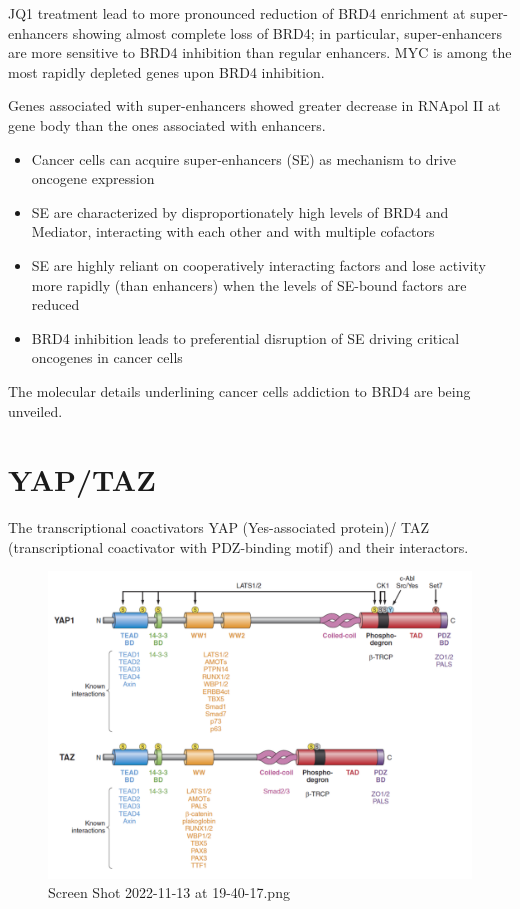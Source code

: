 JQ1 treatment lead to more pronounced reduction of BRD4 enrichment at super- enhancers showing almost complete loss of BRD4; in particular, super-enhancers are more sensitive to BRD4 inhibition than regular enhancers. MYC is among the most rapidly depleted genes upon BRD4 inhibition.

Genes associated with super-enhancers showed greater decrease in RNApol II at gene body than the ones associated with enhancers.

\begin{itemize}
\tightlist
\item
  Cancer cells can acquire super-enhancers (SE) as mechanism to drive oncogene expression
\item
  SE are characterized by disproportionately high levels of BRD4 and Mediator, interacting with each other and with multiple cofactors
\item
  SE are highly reliant on cooperatively interacting factors and lose activity more rapidly (than enhancers) when the levels of SE-bound factors are reduced
\item
  BRD4 inhibition leads to preferential disruption of SE driving critical oncogenes in cancer cells
\end{itemize}

The molecular details underlining cancer cells addiction to BRD4 are being unveiled.

\hypertarget{yaptaz}{%
\section{YAP/TAZ}\label{yaptaz}}

The transcriptional coactivators YAP (Yes-associated protein)/ TAZ (transcriptional coactivator with PDZ-binding motif) and their interactors.

\begin{figure}
\centering
\includegraphics{../_resources/Screen_Shot_2022-11-13_at_19-40-17.png}
\caption{Screen Shot 2022-11-13 at 19-40-17.png}
\end{figure}

